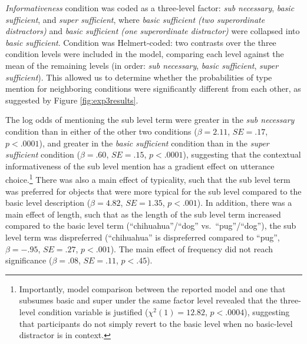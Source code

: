 \documentclass[11pt]{article}
\newcommand{\figref}[1]{Figure \ref{#1}}
\begin{document}
\emph{Informativeness} condition was coded as a three-level factor: \emph{sub necessary}, \emph{basic sufficient}, and \emph{super sufficient}, where \emph{basic sufficient (two superordinate distractors)} and \emph{basic sufficient (one superordinate distractor)} were collapsed into \emph{basic sufficient}. Condition was Helmert-coded: two contrasts over the three condition levels were included in the model, comparing each level against the mean of the remaining levels (in order: \emph{sub necessary}, \emph{basic sufficient}, \emph{super sufficient}). This allowed us to determine whether the probabilities of type mention  for neighboring conditions were significantly different from each other, as suggested by \figref{fig:exp3results}.

%

The log odds of mentioning the sub level term were greater in the \emph{sub necessary} condition than in either of the other two conditions ($\beta = 2.11$, $SE = .17$, $p < .0001$), and greater in the \emph{basic sufficient} condition than in the \emph{super sufficient} condition ($\beta = .60$, $SE = .15$, $p < .0001$), suggesting that the contextual informativeness of the sub level mention has a gradient effect on utterance choice.\footnote{Importantly, model comparison between the reported model and one that subsumes basic and super under the same factor level revealed that the three-level condition variable is justified ($\chi ^2 (1) = 12.82$, $p < .0004$), suggesting that participants do not simply revert to the basic level when no basic-level distractor is in context.} There was also a main effect of typicality, such that the sub level term was preferred for objects that were more typical for the sub level compared to the basic level  description ($\beta = 4.82$, $SE = 1.35$, $p < .001$). In addition, there was a main effect of length, such that as the length of the sub level term increased compared to the basic level term (``chihuahua''/``dog'' vs.~``pug''/``dog''), the sub level term was dispreferred (``chihuahua'' is dispreferred compared to ``pug'', $\beta = -.95$, $SE = .27$, $p < .001$). The main effect of frequency did not reach significance ($\beta = .08$, $SE = .11$, $p < .45$).
\end{document}
